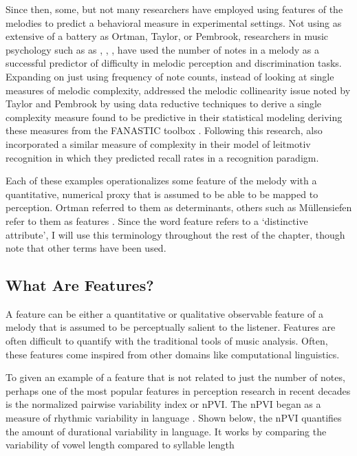 \documentclass[]{book}
\begin{document}
Since then, some, but not many researchers have employed using features of the melodies to predict a behavioral measure in experimental settings.
Not using as extensive of a battery as Ortman, Taylor, or Pembrook, researchers in music psychology such as as \citet{akiva-kabiriMemoryTonalPitches2009}, \citet{dewittRecognitionNovelMelodies1986}, \citet{eerolaExpectancySamiYoiks2009}, \citet{schulzeWorkingMemorySpeech2012a} have used the number of notes in a melody as a successful predictor of difficulty in melodic perception and discrimination tasks.
Expanding on just using frequency of note counts, \citet{harrisonModellingMelodicDiscrimination2016} instead of looking at single measures of melodic complexity, addressed the melodic collinearity issue noted by Taylor and Pembrook by using data reductive techniques to derive a single complexity measure found to be predictive in their statistical modeling deriving these measures from the FANASTIC toolbox \citep{mullensiefenFantasticFeatureANalysis2009}.
Following this research, \citet{bakerPerceptionLeitmotivesRichard2017} also incorporated a similar measure of complexity in their model of leitmotiv recognition in which they predicted recall rates in a recognition paradigm.

Each of these examples operationalizes some feature of the melody with a quantitative, numerical proxy that is assumed to be able to be mapped to perception.
Ortman referred to them as determinants, others such as Müllensiefen refer to them as features \citep{mullensiefenFantasticFeatureANalysis2009}.
Since the word feature refers to a `distinctive attribute', I will use this terminology throughout the rest of the chapter, though note that other terms have been used.

\hypertarget{what-are-features}{%
\subsection{What Are Features?}\label{what-are-features}}

A feature can be either a quantitative or qualitative observable feature of a melody that is assumed to be perceptually salient to the listener.
Features are often difficult to quantify with the traditional tools of music analysis.
Often, these features come inspired from other domains like computational linguistics.

To given an example of a feature that is not related to just the number of notes, perhaps one of the most popular features in perception research in recent decades is the normalized pairwise variability index or nPVI.
The nPVI began as a measure of rhythmic variability in language \citep{grabeDurationalVariabilitySpeech2002}.
Shown below, the nPVI quantifies the amount of durational variability in language.
It works by comparing the variability of vowel length compared to syllable length
\end{document}
